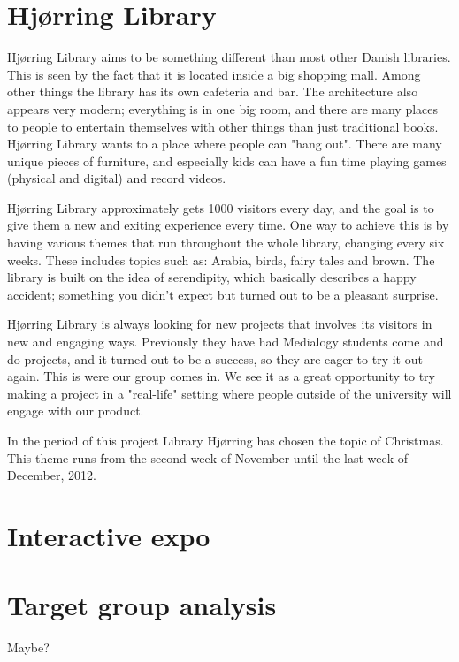 \section{Hjørring Library}
Hjørring Library aims to be something different than most other Danish libraries. This is seen by the fact that it is located inside a big shopping mall. Among other things the library has its own cafeteria and bar. The architecture also appears very modern; everything is in one big room, and there are many places to people to entertain themselves with other things than just traditional books. Hjørring Library wants to a place where people can "hang out". There are many unique pieces of furniture, and especially kids can have a fun time playing games (physical and digital) and record videos.

Hjørring Library approximately gets 1000 visitors every day, and the goal is to give them a new and exiting experience every time. One way to achieve this is by having various themes that run throughout the whole library, changing every six weeks. These includes topics such as: Arabia, birds, fairy tales and brown. The library is built on the idea of serendipity, which basically describes a happy accident; something you didn't expect but turned out to be a pleasant surprise.

Hjørring Library is always looking for new projects that involves its visitors in new and engaging ways. Previously they have had Medialogy students come and do projects, and it turned out to be a success, so they are eager to try it out again. This is were our group comes in. We see it as a great opportunity to try making a project in a "real-life" setting where people outside of the university will engage with our product.

In the period of this project Library Hjørring has chosen the topic of Christmas. This theme runs from the second week of November until the last week of December, 2012.

\section{Interactive expo}

\section{Target group analysis}
Maybe?